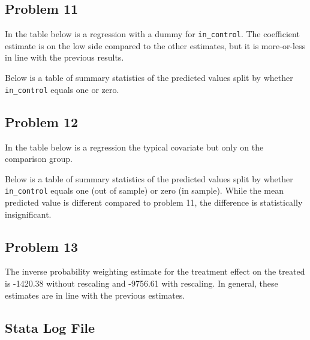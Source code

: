 \documentclass{article}
\begin{document}
\subsection*{Problem 11}

In the table below is a regression with a dummy for \texttt{in\_control}.  The coefficient estimate is on the low side compared to the other estimates, but it is more-or-less in line with the previous results.

\begin{center}

\end{center}

Below is a table of summary statistics of the predicted values split by whether \texttt{in\_control} equals one or zero.

\begin{center}

\end{center}

\pagebreak

\subsection*{Problem 12}

In the table below is a regression the typical covariate but only on the comparison group.

\begin{center}

\end{center}

Below is a table of summary statistics of the predicted values split by whether \texttt{in\_control} equals one (out of sample) or zero (in sample).  While the mean predicted value is different compared to problem 11, the difference is statistically insignificant.

\begin{center}

\end{center}

\subsection*{Problem 13}

The inverse probability weighting estimate for the treatment effect on the treated is -1420.38 without rescaling and -9756.61 with rescaling.  In general, these estimates are in line with the previous estimates.

\pagebreak

\begin{landscape}
\section{Stata Log File}

\end{landscape}
\end{document}
